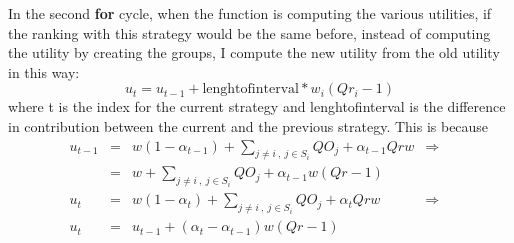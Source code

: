 \documentclass{article}
\begin{document}
In the second \textbf{for} cycle, when the function is computing the various utilities, if the ranking with this strategy would be the same before, instead of computing the utility by creating the groups, I compute the new utility from the old utility in this way:
$$
u_{t}=u_{t-1}+\textrm{lenghtofinterval} *w_{i}\left(Qr_{i}-1\right) 
$$
where t is the index for the current strategy and lenghtofinterval is the difference in contribution between the current and the previous strategy.
This is because
\begin{align*}
u_{t-1} &=& w\left(1-\alpha_{t-1}\right)+\sum_{j\neq i\:,\: j\in S_{i}}QO_{j}
+\alpha_{t-1}Qrw &\Rightarrow& \\
&=& w+\sum_{j\neq i\:,\: j\in S_{i}}QO_{j}+\alpha_{t-1}w\left(Qr-1\right)
 & & \\
u_{t} &=& w\left(1-\alpha_{t}\right)+\sum_{j\neq i\:,\: j\in S_{i}}QO_{j}
+\alpha_{t}Qrw &\Rightarrow& \\
u_{t} &=& u_{t-1}+\left(\alpha_{t}-\alpha_{t-1}\right)w\left(Qr-1\right) &&
\end{align*}

\end{document}
